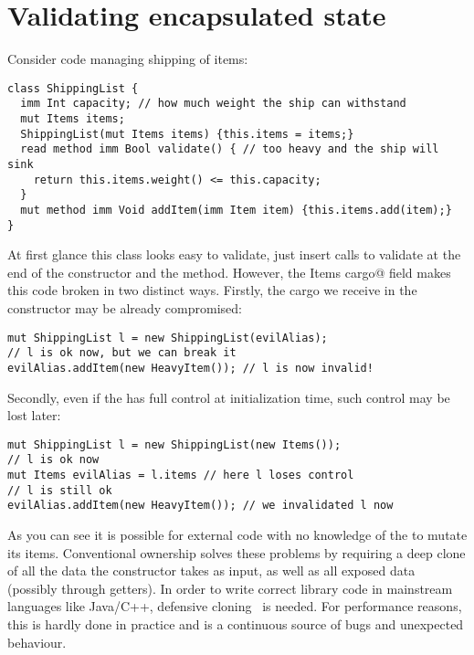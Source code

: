 \saveSpace
\section{Validating encapsulated state}
\label{s:encapsulated}
\saveSpace




Consider code managing shipping of items:
\saveSpace
\begin{lstlisting}
class ShippingList {
  imm Int capacity; // how much weight the ship can withstand
  mut Items items;
  ShippingList(mut Items items) {this.items = items;}
  read method imm Bool validate() {	// too heavy and the ship will sink
    return this.items.weight() <= this.capacity;
  }
  mut method imm Void addItem(imm Item item) {this.items.add(item);}
}
\end{lstlisting}
\saveSpace
At first glance this class looks easy to validate, just insert calls to validate at the end of the constructor and the \Q@addItem@ method.
However, the \Q@mut Items cargo@ field makes this code broken in two distinct ways.
Firstly, the cargo we receive in the constructor may be already compromised:
\saveSpace
\begin{lstlisting}
mut ShippingList l = new ShippingList(evilAlias);
// l is ok now, but we can break it
evilAlias.addItem(new HeavyItem()); // l is now invalid!
\end{lstlisting}
\saveSpace 
Secondly, even if the \Q@ShippingList@ has full control at initialization time, such control may be lost later:
\saveSpace
\begin{lstlisting}
mut ShippingList l = new ShippingList(new Items());
// l is ok now
mut Items evilAlias = l.items // here l loses control
// l is still ok
evilAlias.addItem(new HeavyItem()); // we invalidated l now
\end{lstlisting}
\saveSpace
As you can see it is possible for external code with no knowledge of the \Q@ShippingList@ to mutate its items.
Conventional ownership solves these problems by requiring a deep clone of all the data the constructor takes as input, as well as all exposed data (possibly through getters).
In order to write correct library code in mainstream languages like Java/C++, defensive cloning~\cite{Bloch08} is needed.
For performance reasons, this is hardly done in practice and is a continuous source of bugs and unexpected behaviour.

